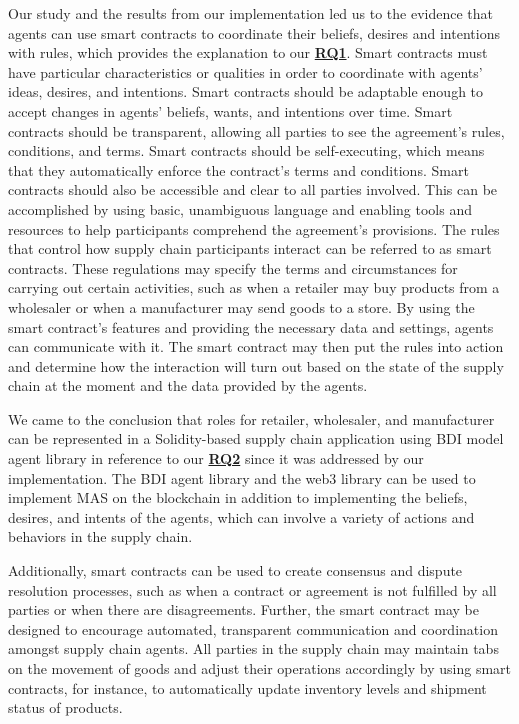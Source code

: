 Our study and the results from our implementation led us to the evidence that agents can use smart contracts to coordinate their beliefs, desires and intentions with rules, which provides the explanation to our \hyperref[RQ1.]{\textbf{RQ1}}. Smart contracts must have particular characteristics or qualities in order to coordinate with agents' ideas, desires, and intentions. Smart contracts should be adaptable enough to accept changes in agents' beliefs, wants, and intentions over time. Smart contracts should be transparent, allowing all parties to see the agreement's rules, conditions, and terms. Smart contracts should be self-executing, which means that they automatically enforce the contract's terms and conditions. Smart contracts should also be accessible and clear to all parties involved. This can be accomplished by using basic, unambiguous language and enabling tools and resources to help participants comprehend the agreement's provisions. The rules that control how supply chain participants interact can be referred to as smart contracts. These regulations may specify the terms and circumstances for carrying out certain activities, such as when a retailer may buy products from a wholesaler or when a manufacturer may send goods to a store. By using the smart contract's features and providing the necessary data and settings, agents can communicate with it. The smart contract may then put the rules into action and determine how the interaction will turn out based on the state of the supply chain at the moment and the data provided by the agents.

\vspace{.5cm}

We came to the conclusion that roles for retailer, wholesaler, and manufacturer can be represented in a Solidity-based supply chain application using \ac{BDI} model agent library in reference to our \hyperref[RQ2.]{\textbf{RQ2}} since it was addressed by our implementation. The \ac{BDI} agent library and the web3 library can be used to implement \ac{MAS} on the blockchain in addition to implementing the beliefs, desires, and intents of the agents, which can involve a variety of actions and behaviors in the supply chain.

\vspace{.5cm}

Additionally, smart contracts can be used to create consensus and dispute resolution processes, such as when a contract or agreement is not fulfilled by all parties or when there are disagreements. Further, the smart contract may be designed to encourage automated, transparent communication and coordination amongst supply chain agents. All parties in the supply chain may maintain tabs on the movement of goods and adjust their operations accordingly by using smart contracts, for instance, to automatically update inventory levels and shipment status of products.

